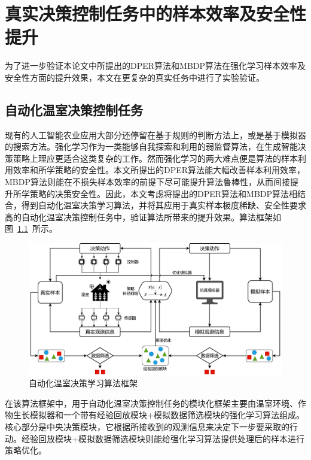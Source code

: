 
\chapter{真实决策控制任务中的样本效率及安全性提升}\label{chap:greenhouse}

为了进一步验证本论文中所提出的DPER算法和MBDP算法在强化学习样本效率及安全性方面的提升效果，本文在更复杂的真实任务中进行了实验验证。

\section{自动化温室决策控制任务}

现有的人工智能农业应用大部分还停留在基于规则的判断方法上，或是基于模拟器的搜索方法\cite{cao2021igrow,an2021simulator}。强化学习作为一类能够自我探索和利用的弱监督算法，在生成智能决策策略上理应更适合这类复杂的工作。然而强化学习的两大难点便是算法的样本利用效率和所学策略的安全性\cite{zhang2021robust}。本文所提出的DPER算法能大幅改善样本利用效率，MBDP算法则能在不损失样本效率的前提下尽可能提升算法鲁棒性，从而间接提升所学策略的决策安全性。因此，本文考虑将提出的DPER算法和MBDP算法相结合，得到自动化温室决策学习算法，并将其应用于真实样本极度稀缺、安全性要求高的自动化温室决策控制任务中，验证算法所带来的提升效果。算法框架如图~\ref{fig:framework}~所示。

\begin{figure}[ht]
\centering
\includegraphics[width=\textwidth]{figures/framework.pdf}
\caption{自动化温室决策学习算法框架}
\label{fig:framework}
\end{figure}

在该算法框架中，用于自动化温室决策控制任务的模块化框架主要由温室环境、作物生长模拟器和一个带有经验回放模块+模拟数据筛选模块的强化学习算法组成。核心部分是中央决策模块，它根据所接收到的观测信息来决定下一步要采取的行动。经验回放模块+模拟数据筛选模块则能给强化学习算法提供处理后的样本进行策略优化。

